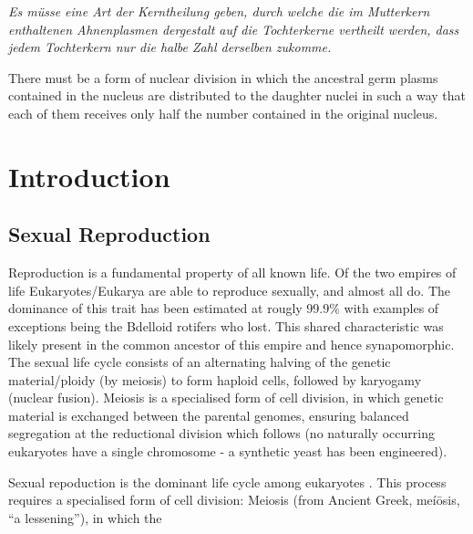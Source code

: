 \begin{savequote}[8cm]
\textit{Es müsse eine Art der Kerntheilung geben, durch welche die im Mutterkern enthaltenen Ahnenplasmen dergestalt auf die Tochterkerne vertheilt werden, dass jedem Tochterkern nur die halbe Zahl derselben zukomme.}

There must be a form of nuclear division in which the ancestral germ plasms contained in the nucleus are distributed to the daughter nuclei in such a way that each of them receives only half the number contained in the original nucleus.
\end{savequote}

\chapter{\label{ch:1-intro}Introduction} 

\minitoc



\section{Sexual Reproduction}
Reproduction is a fundamental property of all known life. Of the two empires of life Eukaryotes/Eukarya are able to reproduce sexually, and almost all do. The dominance of this trait has been estimated at rougly 99.9\% with examples of exceptions being the Bdelloid rotifers who lost. This shared characteristic was likely present in the common ancestor of this empire and hence synapomorphic. The sexual life cycle consists of an alternating halving of the genetic material/ploidy (by meiosis) to form haploid cells, followed by karyogamy (nuclear fusion). Meiosis is a specialised form of cell division, in which genetic material is exchanged between the parental genomes, ensuring balanced segregation at the reductional division which follows (no naturally occurring eukaryotes have a single chromosome - a synthetic yeast has been engineered).

Sexual repoduction is the dominant life cycle among eukaryotes \cite{White1978}. This process requires a specialised form of cell division: Meiosis (from Ancient Greek, meíōsis, “a lessening”), in which the 

